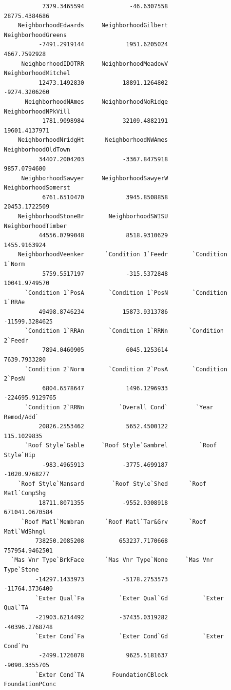 \documentclass[
  letterpaper,
  DIV=11,
  numbers=noendperiod]{scrreprt}
\begin{document}
\begin{verbatim}
           7379.3465594             -46.6307558           28775.4384686 
    NeighborhoodEdwards     NeighborhoodGilbert      NeighborhoodGreens 
          -7491.2919144            1951.6205024            4667.7592928 
     NeighborhoodIDOTRR     NeighborhoodMeadowV     NeighborhoodMitchel 
          12473.1492830           18891.1264802           -9274.3206260 
      NeighborhoodNAmes     NeighborhoodNoRidge     NeighborhoodNPkVill 
           1781.9098984           32109.4882191           19601.4137971 
    NeighborhoodNridgHt      NeighborhoodNWAmes     NeighborhoodOldTown 
          34407.2004203           -3367.8475918            9857.0794600 
     NeighborhoodSawyer     NeighborhoodSawyerW     NeighborhoodSomerst 
           6761.6510470            3945.8508858           20453.1722509 
    NeighborhoodStoneBr       NeighborhoodSWISU      NeighborhoodTimber 
          44556.0799048            8518.9310629            1455.9163924 
    NeighborhoodVeenker      `Condition 1`Feedr       `Condition 1`Norm 
           5759.5517197            -315.5372848           10041.9749570 
      `Condition 1`PosA       `Condition 1`PosN       `Condition 1`RRAe 
          49498.8746234           15873.9313786          -11599.3284625 
      `Condition 1`RRAn       `Condition 1`RRNn      `Condition 2`Feedr 
           7894.0460905            6045.1253614            7639.7933280 
      `Condition 2`Norm       `Condition 2`PosA       `Condition 2`PosN 
           6804.6578647            1496.1296933         -224695.9129765 
      `Condition 2`RRNn          `Overall Cond`        `Year Remod/Add` 
          20826.2553462            5652.4500122             115.1029835 
      `Roof Style`Gable     `Roof Style`Gambrel         `Roof Style`Hip 
           -983.4965913           -3775.4699187           -1020.9768277 
    `Roof Style`Mansard        `Roof Style`Shed      `Roof Matl`CompShg 
          18711.8071355           -9552.0308918          671041.0670584 
     `Roof Matl`Membran      `Roof Matl`Tar&Grv      `Roof Matl`WdShngl 
         738250.2085208          653237.7170668          757954.9462501 
  `Mas Vnr Type`BrkFace      `Mas Vnr Type`None     `Mas Vnr Type`Stone 
         -14297.1433973           -5178.2753573          -11764.3736400 
         `Exter Qual`Fa          `Exter Qual`Gd          `Exter Qual`TA 
         -21903.6214492          -37435.0319282          -40396.2768748 
         `Exter Cond`Fa          `Exter Cond`Gd          `Exter Cond`Po 
          -2499.1726078            9625.5181637           -9090.3355705 
         `Exter Cond`TA        FoundationCBlock         FoundationPConc 

\end{verbatim}
\end{document}
